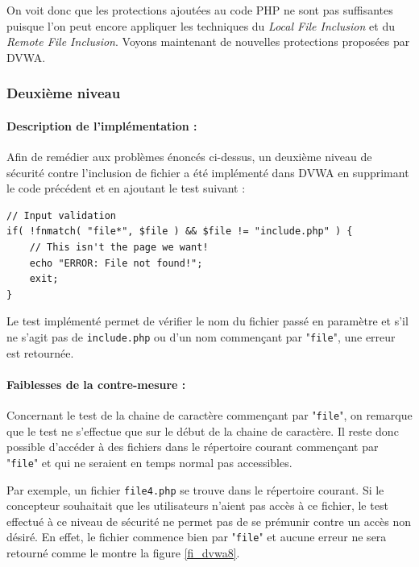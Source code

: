 On voit donc que les protections ajoutées au code PHP ne sont pas suffisantes puisque l'on peut encore appliquer les techniques du \textit{Local File Inclusion} et du \textit{Remote File Inclusion}. Voyons maintenant de nouvelles protections proposées par DVWA.

\subsubsection{Deuxième niveau}

\paragraph{Description de l'implémentation :}


Afin de remédier aux problèmes énoncés ci-dessus, un deuxième niveau de sécurité contre l'inclusion de fichier a été implémenté dans DVWA en supprimant le code précédent et en ajoutant le test  suivant :
\begin{lstlisting}
// Input validation
if( !fnmatch( "file*", $file ) && $file != "include.php" ) {
    // This isn't the page we want!
    echo "ERROR: File not found!";
    exit;
} 
\end{lstlisting}

Le test implémenté permet de vérifier le nom du fichier passé en paramètre et s'il ne s'agit pas de \texttt{include.php} ou d'un nom commençant par "\texttt{file}", une erreur est retournée.

\paragraph{Faiblesses de la contre-mesure :}

Concernant le test de la chaine de caractère commençant par "\texttt{file}", on remarque que le test ne s'effectue que sur le début de la chaine de caractère. Il reste donc possible d'accéder à des fichiers dans le répertoire courant commençant par "\texttt{file}" et qui ne seraient en temps normal pas accessibles. 

Par exemple, un fichier \texttt{file4.php} se trouve dans le répertoire courant. Si le concepteur souhaitait que les utilisateurs n'aient pas accès à ce fichier, le test effectué à ce niveau de sécurité ne permet pas de se prémunir contre un accès non désiré. En effet, le fichier commence bien par "\texttt{file}" et aucune erreur ne sera retourné comme le montre la figure \ref{fi_dvwa8}.

